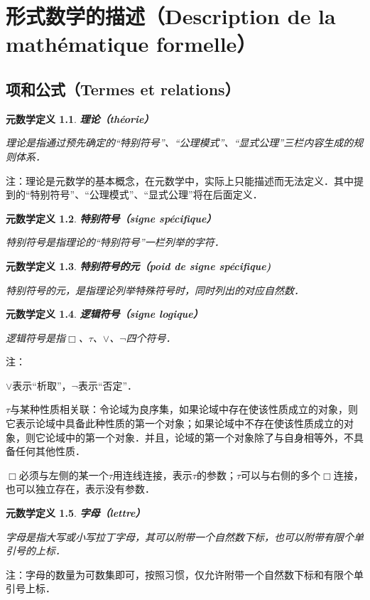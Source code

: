 \documentclass[12pt, a4paper, oneside]{book}
\newtheorem{metadef}{元数学定义}
\begin{document}
	\newpage
	\tableofcontents
	\mainmatter
	
	\chapter{形式数学的描述（Description de la mathématique formelle）}
		\section{项和公式（Termes et relations）}
			\begin{metadef}
				\textbf{理论（théorie）}
				\par
				理论是指通过预先确定的“特别符号”、“公理模式”、“显式公理”三栏内容生成的规则体系．
			\end{metadef}
			\par
			注：理论是元数学的基本概念，在元数学中，实际上只能描述而无法定义．其中提到的“特别符号”、“公理模式”、“显式公理”将在后面定义．
			
			\begin{metadef}
				\textbf{特别符号（signe spécifique）}
				\par
				特别符号是指理论的“特别符号”一栏列举的字符．
			\end{metadef}

			\begin{metadef}
				\textbf{特别符号的元（poid de signe spécifique)}
				\par
				特别符号的元，是指理论列举特殊符号时，同时列出的对应自然数．
			\end{metadef}		

			\begin{metadef}
				\textbf{逻辑符号（signe logique）}
				\par
				逻辑符号是指$\Box$、$\tau$、$\lor$、$\neg$四个符号．
			\end{metadef}
			\par		
			注：
			\par
			$\lor$表示“析取”，$\neg$表示“否定”．
			\par
			$\tau$与某种性质相关联：令论域为良序集，如果论域中存在使该性质成立的对象，则它表示论域中具备此种性质的第一个对象；如果论域中不存在使该性质成立的对象，则它论域中的第一个对象．并且，论域的第一个对象除了与自身相等外，不具备任何其他性质．
			\par
			$\Box$必须与左侧的某一个$\tau$用连线连接，表示$\tau$的参数；$\tau$可以与右侧的多个$\Box$连接，也可以独立存在，表示没有参数．

			\begin{metadef}
				\textbf{字母（lettre）}
				\par
				字母是指大写或小写拉丁字母，其可以附带一个自然数下标，也可以附带有限个单引号的上标．
			\end{metadef}				
			\par
			注：字母的数量为可数集即可，按照习惯，仅允许附带一个自然数下标和有限个单引号上标．
\end{document}
